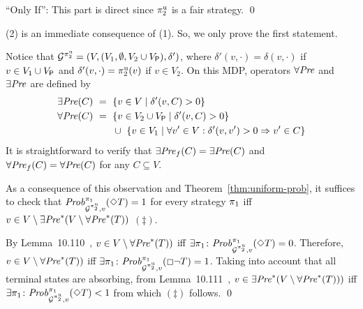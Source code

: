 \begin{myproof}
\noindent ``Only If'': This part is direct since $\pi^{\mathrm{u}}_{2}$ is a fair strategy.
\qed
\end{myproof} 

\begin{myproof}
  (2) is an immediate consequence of (1). So, we only prove the first
  statement.

  Notice that
  $\mathcal{G}^{\pi^{\mathrm{u}}_{2}} = (V, (V_1, \emptyset, {V_2 \cup V_{\mathsf{P}}}), \delta')$,
  where $\delta'(v,\cdot)=\delta(v,\cdot)$ if $v\in V_1\cup V_{\mathsf{P}}$
  and $\delta'(v,\cdot)=\pi^{\mathrm{u}}_{2}(v)$ if $v\in V_2$.
  On this MDP, operators $\forall\mathit{Pre}$ and $\exists\mathit{Pre}$ are defined by
  \begin{align*}
    \exists\mathit{Pre}(C) \ = \ {}&\{ v \in V \mid \delta'(v,C) > 0\} \\
    \forall\mathit{Pre}(C) \ = \ {}&\{ v \in V_2\cup V_{\mathsf{P}} \mid \delta'(v,C) > 0\} \\
		     &\cup \ \{ v \in  V_1 \mid \forall v' \in V : \delta'(v,v') > 0 \Rightarrow v' \in C \}
  \end{align*}
  It is straightforward to verify that $\exists\mathit{Pre}_f(C)=\exists\mathit{Pre}(C)$ and
  $\forall\mathit{Pre}_f(C)=\forall\mathit{Pre}(C)$ for any $C\subseteq V$.

  As a consequence of this observation and
  Theorem~\ref{thm:uniform-prob}, it suffices to check that
  $\mathit{Prob}^{\pi_{1}}_{\mathcal{G}^{\pi^{\mathrm{u}}_{2}},v}(\Diamond T)=1$ for every
  strategy $\pi_{1}$ iff
  $v \in V\setminus \exists\mathit{Pre}^*(V \setminus \forall\mathit{Pre}^*(T))$ $(\ddag)$.

  By Lemma~10.110~\cite{BaierK08}, $v\in V \setminus \forall\mathit{Pre}^*(T))$ iff
  $\exists \pi_{1}\colon \mathit{Prob}^{\pi_{1}}_{\mathcal{G}^{\pi^{\mathrm{u}}_{2}},v}(\Diamond T) = 0$.
  Therefore, $v\in V \setminus \forall\mathit{Pre}^*(T))$ iff
  $\exists \pi_{1}\colon \mathit{Prob}^{\pi_{1}}_{\mathcal{G}^{\pi^{\mathrm{u}}_{2}},v}(\Box \neg T) = 1$.
  Taking into account that all terminal states are absorbing, from Lemma~10.111~\cite{BaierK08}, $v\in \exists\mathit{Pre}^*(V \setminus \forall\mathit{Pre}^*(T)))$ iff
  $\exists \pi_{1}\colon \mathit{Prob}^{\pi_{1}}_{\mathcal{G}^{\pi^{\mathrm{u}}_{2}},v}(\Diamond T) < 1$
  from which $(\ddag)$ follows.
  \qed
\end{myproof}

